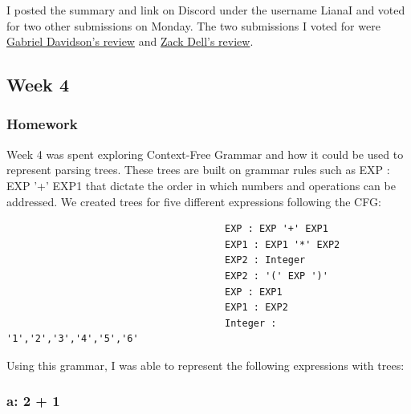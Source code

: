 \documentclass{article}
\theoremstyle{theorem}
\theoremstyle{definition}
\theoremstyle{remark}
\begin{document}
\hspace{0.65cm}I posted the summary and link on Discord under the username LianaI and voted for two other submissions on Monday. The two submissions I voted for were
\href{https://github.com/gabedvdsn/LLMLitReview/edit/main/README.md}{Gabriel Davidson's review} 
 and 
\href{https://github.com/PyroFlareX/LLM-Lit_Review }{Zack Dell's review}. 

\subsection{Week 4}
\subsubsection{Homework}
Week 4 was spent exploring Context-Free Grammar and how it could be used to represent parsing trees.
These trees are built on grammar rules such as EXP : EXP '+' EXP1 that dictate the order in which numbers and operations can be addressed. We created trees for five different expressions following the CFG:
\begin{verbatim}
                                      EXP : EXP '+' EXP1
                                      EXP1 : EXP1 '*' EXP2
                                      EXP2 : Integer
                                      EXP2 : '(' EXP ')'
                                      EXP : EXP1
                                      EXP1 : EXP2
                                      Integer : '1','2','3','4','5','6'
\end{verbatim}
Using this grammar, I was able to represent the following expressions with trees:
\subsubsection*{a: 2 + 1}
\end{document}
